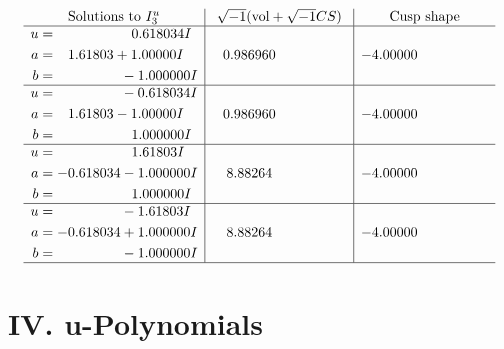 \documentclass[1p]{elsarticle_modified}
\theoremstyle{definition}
\newcommand{\I}{\sqrt{-1}}
\begin{document}
$$\begin{array}{c|c|c}  
\text{Solutions to }I^u_{3}& \I (\text{vol} + \sqrt{-1}CS) & \text{Cusp shape}\\
 \hline 
\begin{aligned}
u &= \phantom{-0.000000 -}0.618034 I \\
a &= \phantom{-}1.61803 + 1.00000 I \\
b &= \phantom{-0.000000 } -1.000000 I\end{aligned}
 & \phantom{-}0.986960\phantom{ +0.000000I} & -4.00000\phantom{ +0.000000I} \\ \hline\begin{aligned}
u &= \phantom{-0.000000 } -0.618034 I \\
a &= \phantom{-}1.61803 - 1.00000 I \\
b &= \phantom{-0.000000 -}1.000000 I\end{aligned}
 & \phantom{-}0.986960\phantom{ +0.000000I} & -4.00000\phantom{ +0.000000I} \\ \hline\begin{aligned}
u &= \phantom{-0.000000 -}1.61803 I \\
a &= -0.618034 - 1.000000 I \\
b &= \phantom{-0.000000 -}1.000000 I\end{aligned}
 & \phantom{-}8.88264\phantom{ +0.000000I} & -4.00000\phantom{ +0.000000I} \\ \hline\begin{aligned}
u &= \phantom{-0.000000 } -1.61803 I \\
a &= -0.618034 + 1.000000 I \\
b &= \phantom{-0.000000 } -1.000000 I\end{aligned}
 & \phantom{-}8.88264\phantom{ +0.000000I} & -4.00000\phantom{ +0.000000I}\\
 \hline 
 \end{array}$$\newpage
\newpage\renewcommand{\arraystretch}{1}
\centering \section*{ IV. u-Polynomials}
\end{document}
